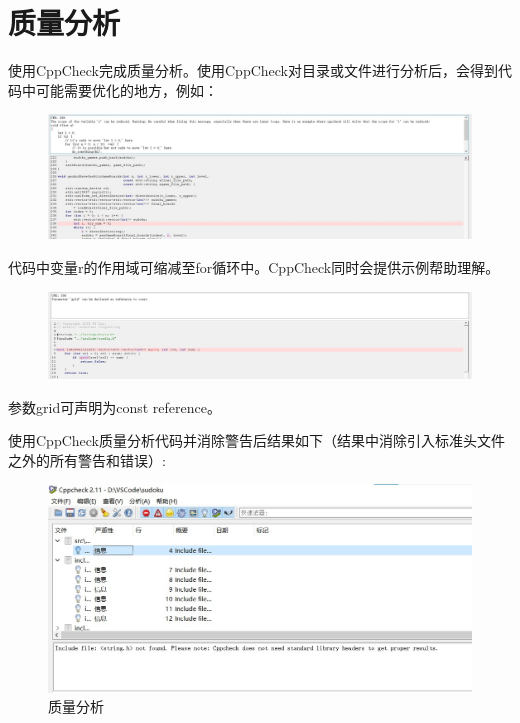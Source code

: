 \documentclass[a4paper]{article}
\begin{document}
\section{质量分析}
使用CppCheck完成质量分析。使用CppCheck对目录或文件进行分析后，会得到代码中可能需要优化的地方，例如：

\begin{figure}[H]
  \centering
  \includegraphics[scale=0.4]{images/ncppcheck.jpg}
  \label{fig:ncppcheck}
\end{figure}

代码中变量r的作用域可缩减至for循环中。CppCheck同时会提供示例帮助理解。


\begin{figure}[H]
  \centering
  \includegraphics[scale=0.4]{images/ncppcheck_2.jpg}
  \label{fig:ncppcheck_2}
\end{figure}

参数grid可声明为const reference。

使用CppCheck质量分析代码并消除警告后结果如下（结果中消除引入标准头文件之外的所有警告和错误）:
\begin{figure}[H]
  \centering
  \includegraphics[scale=0.6]{images/cppcheck.jpg}
  \caption{质量分析}
  \label{fig:cppcheck}
\end{figure}
\end{document}
